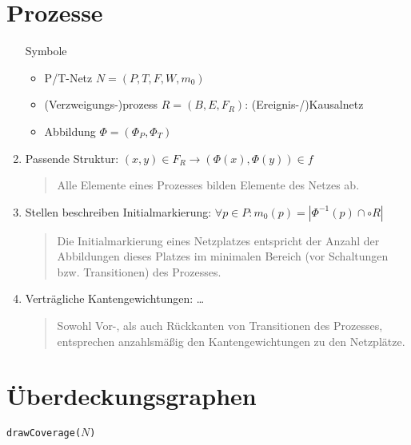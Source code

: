 \documentclass{summary}
\begin{document}
\section{Prozesse}

\begin{enumerate}
  \item[Symbole]
        \begin{itemize}
          \item P/T-Netz $N = (P,T,F,W,m_0)$
          \item (Verzweigungs-)prozess $R=(B,E,F_R)$: (Ereignis-/)Kausalnetz
          \item Abbildung $\Phi =(\Phi_P,\Phi_T)$
        \end{itemize}
  \item Passende Struktur: $(x,y)\in F_R \to (\Phi(x), \Phi(y))\in f$
        \begin{quote}
          Alle Elemente eines Prozesses bilden Elemente des Netzes ab.
        \end{quote}
  \item Stellen beschreiben Initialmarkierung: $\forall p\in P: m_0(p)=|\Phi^{-1}(p)\cap \circ R|$
        \begin{quote}
          Die Initialmarkierung eines Netzplatzes entspricht der Anzahl der Abbildungen dieses Platzes im minimalen Bereich (vor Schaltungen bzw. Transitionen) des Prozesses.
        \end{quote}
  \item Verträgliche Kantengewichtungen: …
        \begin{quote}
          Sowohl Vor-, als auch Rückkanten von Transitionen des Prozesses, entsprechen anzahlsmäßig den Kantengewichtungen zu den Netzplätze.
        \end{quote}
\end{enumerate}

\section{Überdeckungsgraphen}

\begin{algorithm}[H]
  \caption{\texttt{drawCoverage($N$)}}

  \BlankLine

\end{algorithm}
\end{document}
